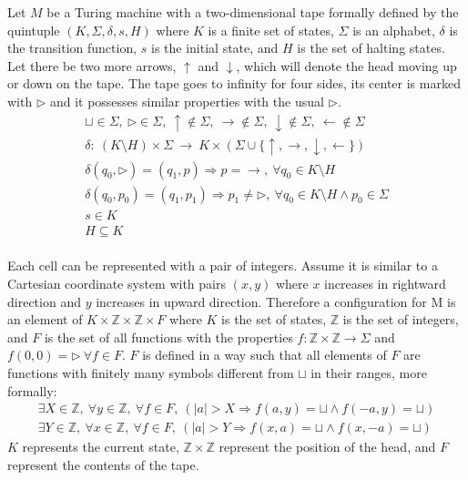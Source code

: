 \documentclass[a4paper]{article}
\begin{document}
Let $M$ be a Turing machine with a two-dimensional tape formally defined by the quintuple $(K, \Sigma, \delta, s, H)$ where $K$ is a finite set of states, $\Sigma$ is an alphabet, $\delta$ is the transition function, $s$ is the initial state, and $H$ is the set of halting states.
Let there be two more arrows, $\uparrow$ and $\downarrow$, which will denote the head moving up or down on the tape.
The tape goes to infinity for four sides, its center is marked with $\triangleright$ and it possesses similar properties with the usual $\triangleright$.
\begin{gather*}
\sqcup \in \Sigma,\ 
\triangleright \in \Sigma,\ 
\uparrow \notin \Sigma,\
\rightarrow \notin \Sigma,\ 
\downarrow \notin \Sigma,\
\leftarrow \notin \Sigma \\
\delta: \ (K \setminus H) \times \Sigma \ \rightarrow \ K \times (\Sigma \cup \{\uparrow, \rightarrow, \downarrow, \leftarrow\}) \\
\delta(q_0, \triangleright) = (q_1, p) \Rightarrow p = \rightarrow, \ \forall q_0 \in K \setminus H \\
\delta(q_0, p_0) = (q_1, p_1) \Rightarrow p_1 \neq \triangleright, \ \forall q_0 \in K \setminus H \land p_0 \in \Sigma \\
s \in K \\
H \subseteq K
\end{gather*}
\\
Each cell can be represented with a pair of integers.
Assume it is similar to a Cartesian coordinate system with pairs $(x,y)$ where $x$ increases in rightward direction and $y$ increases in upward direction.
Therefore a configuration for M is an element of $K \times \mathbb{Z} \times \mathbb{Z} \times F$ where $K$ is the set of states, $\mathbb{Z}$ is the set of integers, and $F$ is the set of all functions with the properties $f:\mathbb{Z} \times \mathbb{Z} \rightarrow \Sigma$ and $f(0,0)=\triangleright \ \forall f \in F$.
$F$ is defined in a way such that all elements of $F$ are functions with finitely many symbols different from $\sqcup$ in their ranges, more formally:
\begin{gather*}
\exists X \in \mathbb{Z},\ \forall y \in \mathbb{Z},\ \forall f \in F,\ (\lvert a \rvert > X \Rightarrow f(a,y) = \sqcup \land f(-a,y) = \sqcup) \\
\exists Y \in \mathbb{Z},\ \forall x \in \mathbb{Z},\ \forall f \in F,\ (\lvert a \rvert > Y \Rightarrow f(x, a) = \sqcup \land f(x,-a) = \sqcup)
\end{gather*}
$K$ represents the current state, $\mathbb{Z} \times \mathbb{Z}$ represent the position of the head, and $F$ represent the contents of the tape. \\
\end{document}
